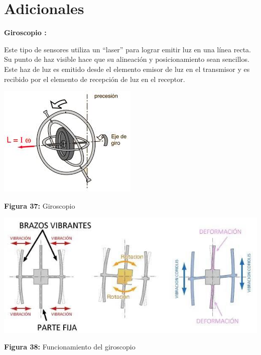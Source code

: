 \vspace{10mm}
\section{Adicionales}
\vspace{10mm}
\textbf{Giroscopio :}

Este tipo de sensores utiliza un “laser” para lograr emitir luz en una línea recta. Su punto de haz visible hace que su alineación y posicionamiento sean sencillos. Este haz de luz es emitido desde el elemento emisor de luz en el transmisor y es recibido por el elemento de recepción de luz en el receptor. 
\vspace{10mm}  %



\begin{center}
	\includegraphics[width=0.3\linewidth, height=0.23\textheight]{img/giros}
	
	\vspace{2mm} %
	
	\textbf{Figura 37:} Giroscopio
\end{center}

\vspace{5mm} %

\begin{center}
	\includegraphics[width=0.6\linewidth]{img/Sgiroscopio}
	
	\vspace{2mm} %
	
	\textbf{Figura 38:} Funcionamiento del giroscopio
\end{center}

